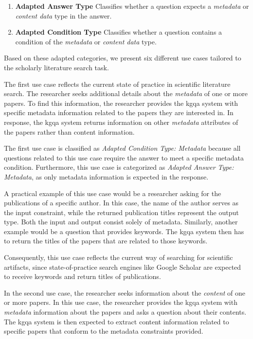\begin{enumerate}[label={}, leftmargin=2.5em]
    \item \textbf{Adapted Answer Type} Classifies whether a question expects a \emph{metadata} or \emph{content data} type in the answer.
    \item \textbf{Adapted Condition Type} Classifies whether a question contains a condition of the \emph{metadata} or \emph{content data} type.
\end{enumerate}

Based on these adapted categories, we present six different use cases tailored to the scholarly literature search task.

\begin{tcolorbox}[title=Use Case 1] %
The first use case reflects the current state of practice in scientific literature search. The researcher seeks additional details about the \emph{metadata} of one or more papers. To find this information, the researcher provides the \gls{kgqa} system with specific metadata information related to the papers they are interested in. In response, the \gls{kgqa} system returns information on other \emph{metadata} attributes of the papers rather than content information.
\end{tcolorbox}

The first use case is classified as \emph{Adapted Condition Type: Metadata} because all questions related to this use case require the answer to meet a specific metadata condition. Furthermore, this use case is categorized as \emph{Adapted Answer Type: Metadata}, as only metadata information is expected in the response.

A practical example of this use case would be a researcher asking for the publications of a specific author. In this case, the name of the author serves as the input constraint, while the returned publication titles represent the output type. Both the input and output consist solely of metadata. Similarly, another example would be a question that provides keywords. The \gls{kgqa} system then has to return the titles of the papers that are related to those keywords. 

Consequently, this use case reflects the current way of searching for scientific artifacts, since state-of-practice search engines like Google Scholar are expected to receive keywords and return titles of publications.

\begin{tcolorbox}[title=Use Case 2] %
In the second use case, the researcher seeks information about the \emph{content} of one or more papers. In this use case, the researcher provides the \gls{kgqa} system with \emph{metadata} information about the papers and asks a question about their contents. The \gls{kgqa} system is then expected to extract content information related to specific papers that conform to the metadata constraints provided.
\end{tcolorbox}


